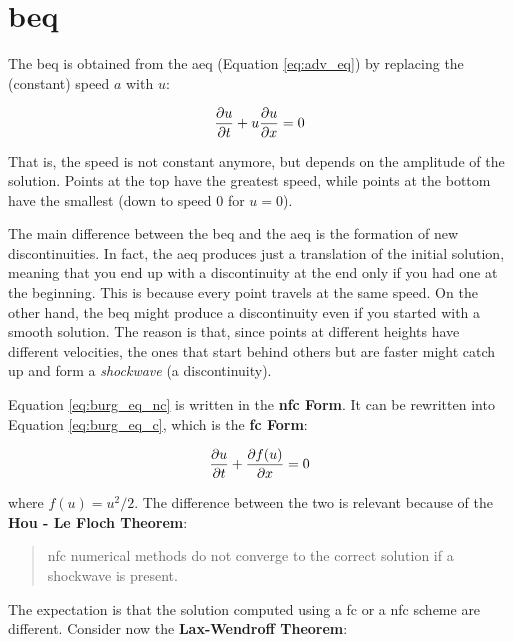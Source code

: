 \documentclass[11pt, a4paper]{article}
\begin{document}
\section{\acrfull{beq}}

The \acrlong{beq} is obtained from the \acrlong{aeq} (Equation \ref{eq:adv_eq}) by replacing the (constant) speed \(a\) with \(u\):

\begin{equation} \label{eq:burg_eq_nc}
    \pdv{u}{t} + u \pdv{u}{x} = 0
\end{equation}

\noindent
That is, the speed is not constant anymore, but depends on the amplitude of the solution. Points at the top have the greatest speed, while points at the bottom have the smallest (down to speed \(0\) for \(u = 0\)).

The main difference between the \acrshort{beq} and the \acrshort{aeq} is the formation of new discontinuities. In fact, the \acrshort{aeq} produces just a translation of the initial solution, meaning that you end up with a discontinuity at the end only if you had one at the beginning. This is because every point travels at the same speed. On the other hand, the \acrshort{beq} might produce a discontinuity even if you started with a smooth solution. The reason is that, since points at different heights have different velocities, the ones that start behind others but are faster might catch up and form a \textit{shockwave} (a discontinuity).

Equation \ref{eq:burg_eq_nc} is written in the \textbf{\acrfull{nfc} Form}. It can be rewritten into Equation \ref{eq:burg_eq_c}, which is the \textbf{\acrfull{fc} Form}:

\begin{equation} \label{eq:burg_eq_c}
    \pdv{u}{t} + \pdv{f(u)}{x} = 0
\end{equation}

\noindent
where \(f(u) = u^2 / 2\). The difference between the two is relevant because of the \textbf{Hou - Le Floch Theorem}:

\begin{quote}
    \acrlong{nfc} numerical methods do not converge to the correct solution if a shockwave is present.
\end{quote}

\noindent
The expectation is that the solution computed using a \acrshort{fc} or a \acrshort{nfc} scheme are different. Consider now the \textbf{Lax-Wendroff Theorem}:
\end{document}

